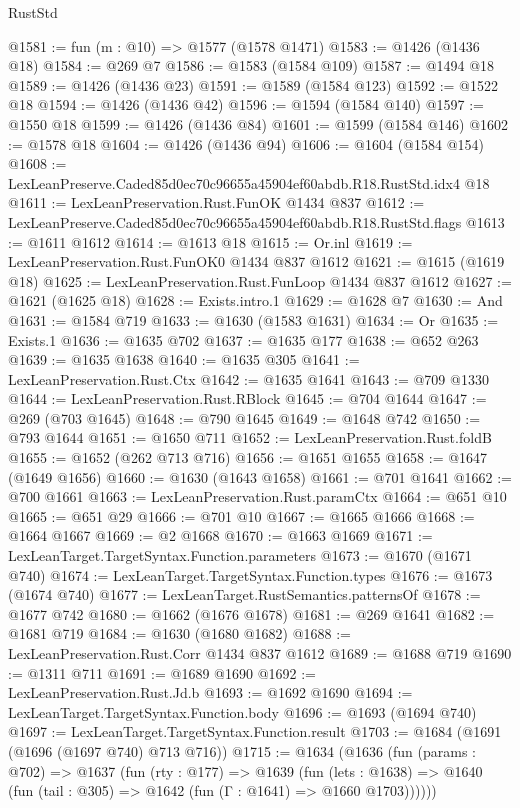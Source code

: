 \begin{lexlean}{RustStd}
\begin{coremodule}
@1581 := fun (m : @10) => @1577 (@1578 @1471)
@1583 := @1426 (@1436 @18)
@1584 := @269 @7
@1586 := @1583 (@1584 @109)
@1587 := @1494 @18
@1589 := @1426 (@1436 @23)
@1591 := @1589 (@1584 @123)
@1592 := @1522 @18
@1594 := @1426 (@1436 @42)
@1596 := @1594 (@1584 @140)
@1597 := @1550 @18
@1599 := @1426 (@1436 @84)
@1601 := @1599 (@1584 @146)
@1602 := @1578 @18
@1604 := @1426 (@1436 @94)
@1606 := @1604 (@1584 @154)
@1608 := LexLeanPreserve.Caded85d0ec70c96655a45904ef60abdb.R18.RustStd.idx4 @18
@1611 := LexLeanPreservation.Rust.FunOK @1434 @837
@1612 := LexLeanPreserve.Caded85d0ec70c96655a45904ef60abdb.R18.RustStd.flags
@1613 := @1611 @1612
@1614 := @1613 @18
@1615 := Or.inl
@1619 := LexLeanPreservation.Rust.FunOK0 @1434 @837 @1612
@1621 := @1615 (@1619 @18)
@1625 := LexLeanPreservation.Rust.FunLoop @1434 @837 @1612
@1627 := @1621 (@1625 @18)
@1628 := Exists.intro.{1}
@1629 := @1628 @7
@1630 := And
@1631 := @1584 @719
@1633 := @1630 (@1583 @1631)
@1634 := Or
@1635 := Exists.{1}
@1636 := @1635 @702
@1637 := @1635 @177
@1638 := @652 @263
@1639 := @1635 @1638
@1640 := @1635 @305
@1641 := LexLeanPreservation.Rust.Ctx
@1642 := @1635 @1641
@1643 := @709 @1330
@1644 := LexLeanPreservation.Rust.RBlock
@1645 := @704 @1644
@1647 := @269 (@703 @1645)
@1648 := @790 @1645
@1649 := @1648 @742
@1650 := @793 @1644
@1651 := @1650 @711
@1652 := LexLeanPreservation.Rust.foldB
@1655 := @1652 (@262 @713 @716)
@1656 := @1651 @1655
@1658 := @1647 (@1649 @1656)
@1660 := @1630 (@1643 @1658)
@1661 := @701 @1641
@1662 := @700 @1661
@1663 := LexLeanPreservation.Rust.paramCtx
@1664 := @651 @10
@1665 := @651 @29
@1666 := @701 @10
@1667 := @1665 @1666
@1668 := @1664 @1667
@1669 := @2 @1668
@1670 := @1663 @1669
@1671 := LexLeanTarget.TargetSyntax.Function.parameters
@1673 := @1670 (@1671 @740)
@1674 := LexLeanTarget.TargetSyntax.Function.types
@1676 := @1673 (@1674 @740)
@1677 := LexLeanTarget.RustSemantics.patternsOf
@1678 := @1677 @742
@1680 := @1662 (@1676 @1678)
@1681 := @269 @1641
@1682 := @1681 @719
@1684 := @1630 (@1680 @1682)
@1688 := LexLeanPreservation.Rust.Corr @1434 @837 @1612
@1689 := @1688 @719
@1690 := @1311 @711
@1691 := @1689 @1690
@1692 := LexLeanPreservation.Rust.Jd.b
@1693 := @1692 @1690
@1694 := LexLeanTarget.TargetSyntax.Function.body
@1696 := @1693 (@1694 @740)
@1697 := LexLeanTarget.TargetSyntax.Function.result
@1703 := @1684 (@1691 (@1696 (@1697 @740) @713 @716))
@1715 := @1634
    (@1636
      (fun (params : @702) =>
      @1637
        (fun (rty : @177) =>
        @1639
          (fun (lets : @1638) =>
          @1640 (fun (tail : @305) => @1642 (fun (Γ : @1641) => @1660 @1703))))))

\end{coremodule}
\end{lexlean}
